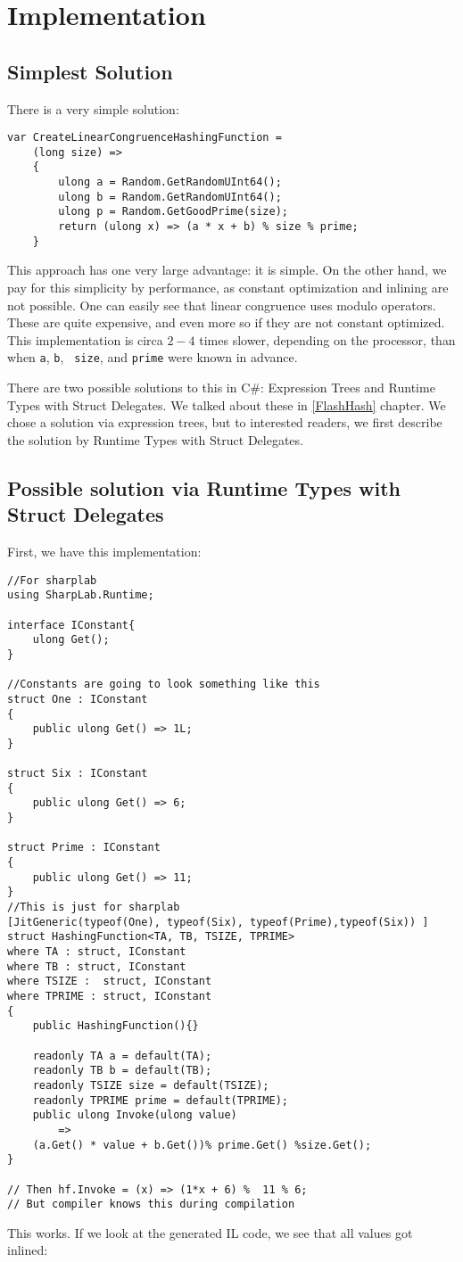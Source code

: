 \section{Implementation}
\subsection{Simplest Solution}
There is a very simple solution:
\begin{lstlisting}
var CreateLinearCongruenceHashingFunction = 
    (long size) =>
    {
        ulong a = Random.GetRandomUInt64();
        ulong b = Random.GetRandomUInt64();
        ulong p = Random.GetGoodPrime(size);
        return (ulong x) => (a * x + b) % size % prime;
    }
\end{lstlisting}
This approach has one very large advantage: it is simple. On the other hand, we pay for this simplicity by performance, as constant optimization and inlining are not possible. One can easily see that linear congruence uses modulo operators. These are quite expensive, and even more so if they are not constant optimized. This implementation is circa $2-4$ times slower, depending on the processor, than when \texttt{a}, \texttt{b}, \texttt{ size}, and \texttt{prime} were known in advance.

There are two possible solutions to this in C\#: Expression Trees and Runtime Types with Struct Delegates. We talked about these in \ref{FlashHash} chapter. We chose a solution via expression trees, but to interested readers, we first describe the solution by Runtime Types with Struct Delegates. 

\subsection{Possible solution via Runtime Types with Struct Delegates}
First, we have this implementation:
\begin{lstlisting}
//For sharplab
using SharpLab.Runtime; 

interface IConstant{
    ulong Get();
}

//Constants are going to look something like this
struct One : IConstant
{
    public ulong Get() => 1L; 
}

struct Six : IConstant
{
    public ulong Get() => 6; 
}

struct Prime : IConstant
{
    public ulong Get() => 11; 
}
//This is just for sharplab
[JitGeneric(typeof(One), typeof(Six), typeof(Prime),typeof(Six)) ]
struct HashingFunction<TA, TB, TSIZE, TPRIME> 
where TA : struct, IConstant
where TB : struct, IConstant
where TSIZE :  struct, IConstant
where TPRIME : struct, IConstant
{
    public HashingFunction(){}
    
    readonly TA a = default(TA);
    readonly TB b = default(TB);
    readonly TSIZE size = default(TSIZE);
    readonly TPRIME prime = default(TPRIME);
    public ulong Invoke(ulong value) 
        => 
    (a.Get() * value + b.Get())% prime.Get() %size.Get();
} 

// Then hf.Invoke = (x) => (1*x + 6) %  11 % 6;
// But compiler knows this during compilation
\end{lstlisting}
This works. If we look at the generated IL code, we see that all values got inlined:

